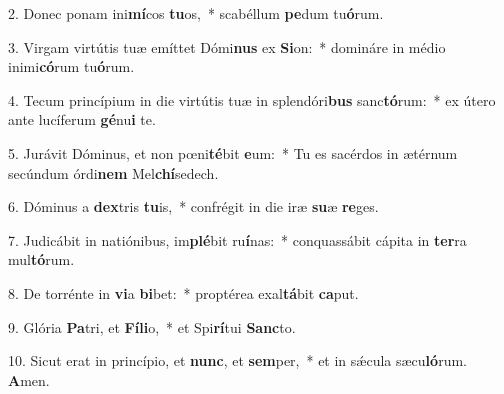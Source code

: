 2. Donec ponam ini\textbf{mí}cos \textbf{tu}os,~*  scabéllum \textbf{pe}dum tu\textbf{ó}rum.\

3. Virgam virtútis tuæ emíttet Dómi\textbf{nus} ex \textbf{Si}on:~*  domináre in médio inimi\textbf{có}rum tu\textbf{ó}rum.\

4. Tecum princípium in die virtútis tuæ in splendóri\textbf{bus} sanc\textbf{tó}rum:~*  ex útero ante lucíferum \textbf{gé}nu\textbf{i} te.\

5. Jurávit Dóminus, et non pœni\textbf{té}bit \textbf{e}um:~*  Tu es sacérdos in ætérnum secúndum órdi\textbf{nem} Mel\textbf{chí}sedech.\

6. Dóminus a \textbf{dex}tris \textbf{tu}is,~*  confrégit in die iræ \textbf{su}æ \textbf{re}ges.\

7. Judicábit in natiónibus, im\textbf{plé}bit ru\textbf{í}nas:~*  conquassábit cápita in \textbf{ter}ra mul\textbf{tó}rum.\

8. De torrénte in \textbf{vi}a \textbf{bi}bet:~*  proptérea exal\textbf{tá}bit \textbf{ca}put.\

9. Glória \textbf{Pa}tri, et \textbf{Fí}\textbf{li}o,~*  et Spi\textbf{rí}tui \textbf{Sanc}to.\

10. Sicut erat in princípio, et \textbf{nunc}, et \textbf{sem}per,~*  et in sǽcula sæcu\textbf{ló}rum. \textbf{A}men.\

